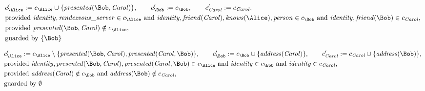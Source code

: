 \begin{align*}
&
c'_
{
\Alice
}
 := 
c_
{
\Alice
}
 \cup 
\{
\mathit{\detokenize{
presented
}}
(
\Bob
,
\mathit{Carol}
)
\}
, \qquad 
c'_
{
\Bob
}
 := 
c_
{
\Bob
}
, \qquad 
c'_
{
\mathit{Carol}
}
 := 
c_
{
\mathit{Carol}
}
,\\
&
\text{provided } 
\mathit{\detokenize{
identity
}}
,
\mathit{\detokenize{
rendezvous_server
}}
 \in c_
{
\Alice
}
 \text{ and } 
\mathit{\detokenize{
identity
}}
,
\mathit{\detokenize{
friend
}}
(
\mathit{Carol}
)
,
\mathit{\detokenize{
knows
}}
(
\Alice
)
,
\mathit{\detokenize{
person
}}
 \in c_
{
\Bob
}
 \text{ and } 
\mathit{\detokenize{
identity
}}
,
\mathit{\detokenize{
friend
}}
(
\Bob
)
 \in c_
{
\mathit{Carol}
}
,\\
&
\text{provided } 
\mathit{\detokenize{
presented
}}
(
\Bob
,
\mathit{Carol}
)
 \notin c_
{
\Alice
}
,\\
&
\text{guarded by } \{
\Bob
\}
\end{align*}

\begin{align*}
&
c'_
{
\Alice
}
 := 
c_
{
\Alice
}
 \setminus 
\{
\mathit{\detokenize{
presented
}}
(
\Bob
,
\mathit{Carol}
)
,
\mathit{\detokenize{
presented
}}
(
\mathit{Carol}
,
\Bob
)
\}
, \qquad 
c'_
{
\Bob
}
 := 
c_
{
\Bob
}
 \cup 
\{
\mathit{\detokenize{
address
}}
(
\mathit{Carol}
)
\}
, \qquad 
c'_
{
\mathit{Carol}
}
 := 
c_
{
\mathit{Carol}
}
 \cup 
\{
\mathit{\detokenize{
address
}}
(
\Bob
)
\}
,\\
&
\text{provided } 
\mathit{\detokenize{
identity
}}
,
\mathit{\detokenize{
presented
}}
(
\Bob
,
\mathit{Carol}
)
,
\mathit{\detokenize{
presented
}}
(
\mathit{Carol}
,
\Bob
)
 \in c_
{
\Alice
}
 \text{ and } 
\mathit{\detokenize{
identity
}}
 \in c_
{
\Bob
}
 \text{ and } 
\mathit{\detokenize{
identity
}}
 \in c_
{
\mathit{Carol}
}
,\\
&
\text{provided } 
\mathit{\detokenize{
address
}}
(
\mathit{Carol}
)
 \notin c_
{
\Bob
}
 \text{ and } 
\mathit{\detokenize{
address
}}
(
\Bob
)
 \notin c_
{
\mathit{Carol}
}
,\\
&
\text{guarded by } \emptyset
\end{align*}
